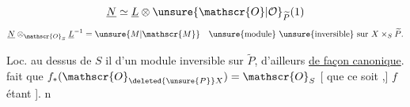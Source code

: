 \[
\underline{N}\simeq\underline{L}\otimes\unsure{\mathscr{O}|\mathcal{O}}_{\widetilde{P}}(1)
\]
\[
\underline{N}\otimes_{\mathscr{O}_{S}}\underline{L}^{-1}=\unsure{M|\mathscr{M}}
\quad\text{\unsure{module} \unsure{inversible} sur }X\times_{S}\widetilde{P}.
\]

Loc. au dessus de $S$ il  d'un module inversible sur $\widetilde{P}$, d'ailleurs \uline{de façon canonique}.  fait que $f_{*}(\mathscr{O}_{\deleted{\unsure{P}}X})=\mathscr{O}_{S}$ [  que ce soit  ,] $f$ étant   ].
n

